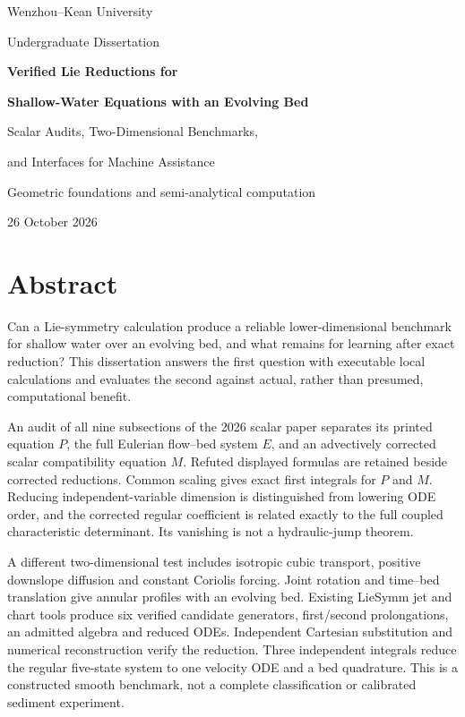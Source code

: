 \documentclass[11pt,a4paper,oneside]{report}
\numberwithin{equation}{chapter}
\begin{document}
\hypersetup{pageanchor=false}
\begin{titlepage}
\centering
{\large Wenzhou--Kean University\par}
\vspace{12mm}
{\large Undergraduate Dissertation\par}
\vspace{25mm}
{\LARGE\bfseries Verified Lie Reductions for\par}
\vspace{4mm}
{\LARGE\bfseries Shallow-Water Equations with an Evolving Bed\par}
\vspace{10mm}
{\Large Scalar Audits, Two-Dimensional Benchmarks,\par
and Interfaces for Machine Assistance\par}
\vspace{15mm}
{\large Geometric foundations and semi-analytical computation\par}
\vfill
{\large 26 October 2026\par}
\end{titlepage}
\hypersetup{pageanchor=true}
\chapter*{Abstract}
Can a Lie-symmetry calculation produce a reliable lower-dimensional benchmark for shallow water over an evolving bed, and what remains for learning after exact reduction? This dissertation answers the first question with executable local calculations and evaluates the second against actual, rather than presumed, computational benefit.

An audit of all nine subsections of the 2026 scalar paper separates its printed equation $P$, the full Eulerian flow--bed system $E$, and an advectively corrected scalar compatibility equation $M$. Refuted displayed formulas are retained beside corrected reductions. Common scaling gives exact first integrals for $P$ and $M$. Reducing independent-variable dimension is distinguished from lowering ODE order, and the corrected regular coefficient is related exactly to the full coupled characteristic determinant. Its vanishing is not a hydraulic-jump theorem.

A different two-dimensional test includes isotropic cubic transport, positive downslope diffusion and constant Coriolis forcing. Joint rotation and time--bed translation give annular profiles with an evolving bed. Existing LieSymm jet and chart tools produce six verified candidate generators, first/second prolongations, an admitted algebra and reduced ODEs. Independent Cartesian substitution and numerical reconstruction verify the reduction. Three independent integrals reduce the regular five-state system to one velocity ODE and a bed quadrature. This is a constructed smooth benchmark, not a complete classification or calibrated sediment experiment.
\end{document}
